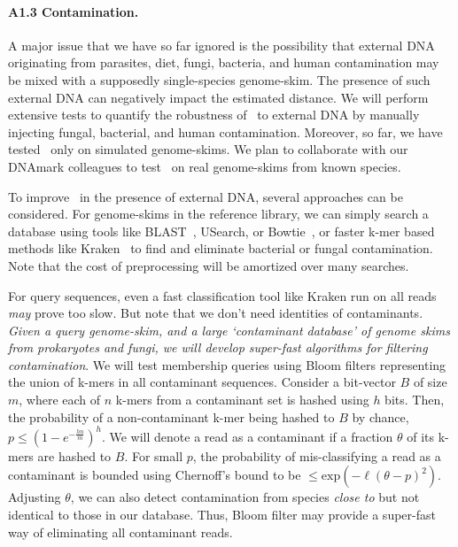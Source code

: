 \paragraph{A1.3 Contamination.}
A major issue that we have so far ignored is 
the possibility that external DNA originating from parasites, diet, fungi, bacteria, and human contamination may be mixed 
with a supposedly single-species genome-skim.
The presence of such external DNA can negatively impact the estimated distance. 
We will perform extensive tests
to quantify the robustness of \skmer\ to 
external DNA by manually injecting
fungal, bacterial, and human contamination.
Moreover, so far, we have tested \skmer\  only on simulated genome-skims. 
We plan to collaborate with our DNAmark colleagues
to test \skmer\ on real genome-skims from known species. 

To improve \skmer\ in the presence of external DNA,
several approaches can be considered.
For genome-skims in the reference library,
we can simply search a database using tools like BLAST~\cite{blast}, USearch\cite{usearch}, or Bowtie~\cite{Langmead2012a}, or faster k-mer based methods like Kraken~\cite{Kraken}  to find and eliminate bacterial or fungal contamination.
Note that the cost of preprocessing will be amortized over many searches.

For query sequences, even a fast classification tool like Kraken run on all reads \textit{may} prove too slow.
But note that we don't need identities of contaminants.
 \emph{Given a query genome-skim, and a large `contaminant database' of genome skims from prokaryotes and fungi, we will develop super-fast algorithms for filtering contamination}.
We will test membership queries using Bloom filters representing the union of k-mers in all contaminant sequences. Consider a bit-vector $B$ of size $m$, where each of $n$ k-mers from a contaminant set is hashed using $h$ bits. Then, the probability of a non-contaminant k-mer being hashed to $B$ by chance, $p \le (1-e^{-\frac{hn}{m}})^h$. We will denote a read as a contaminant if a fraction $\theta$ of its k-mers are hashed to $B$. For small $p$, the probability of mis-classifying a read as a contaminant is bounded using Chernoff's bound to be $\le\text{exp}(-\ell(\theta-p)^2)$.
 Adjusting $\theta$, we 
 can also detect contamination from species
 {\em close to} but not identical to those
 in our database. 
Thus, Bloom filter may provide a super-fast way of eliminating all contaminant reads.

